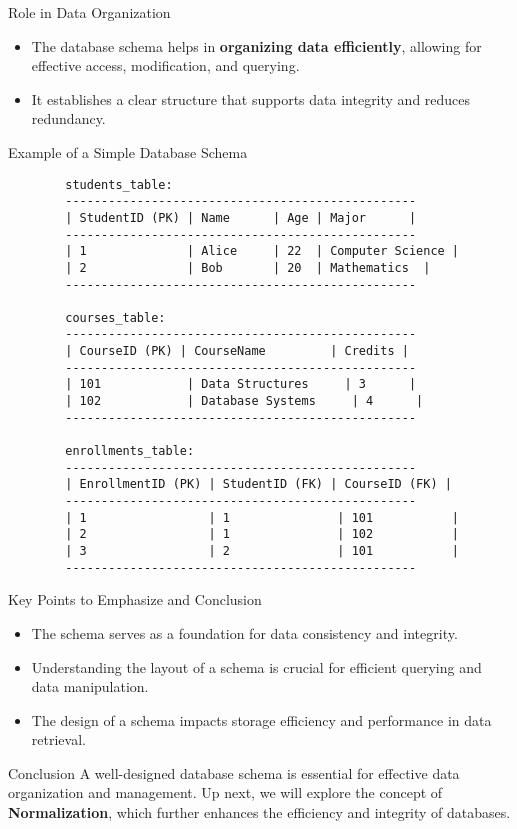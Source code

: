 \documentclass[aspectratio=169]{beamer}
\begin{document}
\begin{frame}[fragile]{Role in Data Organization}
    \begin{itemize}
        \item The database schema helps in \textbf{organizing data efficiently}, allowing for effective access, modification, and querying.
        \item It establishes a clear structure that supports data integrity and reduces redundancy.
    \end{itemize}
    
    \begin{block}{Example of a Simple Database Schema}
        \begin{verbatim}
        students_table: 
        -------------------------------------------------
        | StudentID (PK) | Name      | Age | Major      |
        -------------------------------------------------
        | 1              | Alice     | 22  | Computer Science |
        | 2              | Bob       | 20  | Mathematics  |
        -------------------------------------------------
        
        courses_table:
        -------------------------------------------------
        | CourseID (PK) | CourseName         | Credits |
        -------------------------------------------------
        | 101            | Data Structures     | 3      |
        | 102            | Database Systems     | 4      |
        -------------------------------------------------
        
        enrollments_table:
        -------------------------------------------------
        | EnrollmentID (PK) | StudentID (FK) | CourseID (FK) |
        -------------------------------------------------
        | 1                 | 1               | 101           |
        | 2                 | 1               | 102           |
        | 3                 | 2               | 101           |
        -------------------------------------------------
        \end{verbatim}
    \end{block}
\end{frame}

\begin{frame}[fragile]{Key Points to Emphasize and Conclusion}
    \begin{itemize}
        \item The schema serves as a foundation for data consistency and integrity.
        \item Understanding the layout of a schema is crucial for efficient querying and data manipulation.
        \item The design of a schema impacts storage efficiency and performance in data retrieval.
    \end{itemize}
    
    \begin{block}{Conclusion}
        A well-designed database schema is essential for effective data organization and management. Up next, we will explore the concept of \textbf{Normalization}, which further enhances the efficiency and integrity of databases.
    \end{block}
\end{frame}
\end{document}
